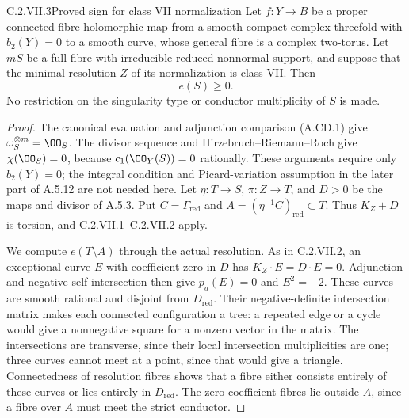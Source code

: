 \begin{idstatement}{C.2.VII.3}{Proved sign for class VII normalization}
\label{st:C.2.VII.3}
Let $f:Y\to B$ be a proper connected-fibre holomorphic
map from a smooth compact complex threefold with
$b_2(Y)=0$ to a smooth curve, whose general fibre is a
complex two-torus. Let $mS$ be a full fibre with
irreducible reduced nonnormal support, and suppose
that the minimal resolution $Z$ of its normalization
is class VII. Then
\[
 e(S)\ge0.
\tag{C.VII.7}
\]
No restriction on the singularity type or conductor
multiplicity of $S$ is made.
\end{idstatement}
\begin{proof}
The canonical evaluation and adjunction comparison
(A.CD.1) give $\omega_S^{\otimes m}=\OO_S$.
The divisor sequence and Hirzebruch--Riemann--Roch
give $\chi(\OO_S)=0$, because $c_1(\OO_Y(S))=0$
rationally. These arguments require only $b_2(Y)=0$;
the integral condition and Picard-variation assumption
in the later part of A.5.12 are not needed here.
Let $\eta:T\to S$, $\pi:Z\to T$, and
$D>0$ be the maps and divisor of A.5.3. Put
$C=\Gamma_{\mathrm{red}}$ and
$A=(\eta^{-1}C)_{\mathrm{red}}\subset T$.
Thus $K_Z+D$ is torsion, and C.2.VII.1--C.2.VII.2
apply.

We compute $e(T\setminus A)$ through the actual
resolution. As in C.2.VII.2, an exceptional curve
$E$ with coefficient zero in $D$ has
$K_Z\cdot E=D\cdot E=0$.
Adjunction and negative self-intersection then give
$p_a(E)=0$ and $E^2=-2$.
These curves are smooth rational and disjoint
from $D_{\mathrm{red}}$.
Their negative-definite intersection matrix makes
each connected configuration a tree: a repeated
edge or a cycle would give a nonnegative square
for a nonzero vector in the matrix. The intersections
are transverse, since their local intersection
multiplicities are one; three curves cannot meet
at a point, since that would give a triangle.
Connectedness of resolution fibres shows that a
fibre either consists entirely of these curves or
lies entirely in $D_{\mathrm{red}}$.
The zero-coefficient fibres lie outside $A$, since
a fibre over $A$ must meet the strict conductor.


\end{proof}

